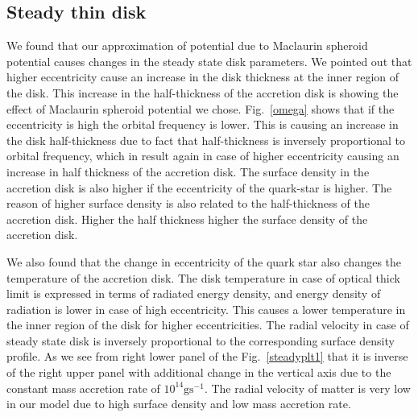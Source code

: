 \documentclass[useAMS,usenatbib]{mn2e}
\begin{document}
\subsection{Steady thin disk}
We found that our approximation of potential due to Maclaurin spheroid potential causes changes in the steady state disk parameters. We pointed out that higher eccentricity cause an increase in the disk thickness at the inner region of the disk. This increase in the half-thickness of the accretion disk is showing the effect of Maclaurin spheroid potential we chose. Fig.~\ref{omega} shows that if the eccentricity is high the orbital frequency is lower. This is causing an increase in the disk half-thickness due to fact that half-thickness is inversely proportional to orbital frequency, which in result again in case of higher eccentricity causing an increase in half thickness of the accretion disk. The surface density in the accretion disk is also higher if the eccentricity of the quark-star is higher. The reason of higher surface density is also related to the half-thickness of the accretion disk. Higher the half thickness higher the surface density of the accretion disk. 

We also found that the change in eccentricity of the quark star also changes the temperature of the accretion disk. The disk temperature in case of optical thick limit is expressed in terms of radiated energy density, and energy density of radiation is lower in case of high eccentricity. This causes a lower temperature in the inner region of the disk for higher eccentricities. The radial velocity in case of steady state disk is inversely proportional to the corresponding surface density profile. As we see from right lower panel of the Fig.~\ref{steadyplt1} that it is inverse of the right upper panel with additional change in the vertical axis due to the constant mass accretion rate of $10^{14} \textrm{g}\textrm{s}^{-1}$. The radial velocity of matter is very low in our model due to high surface density and low mass accretion rate. 
\end{document}
